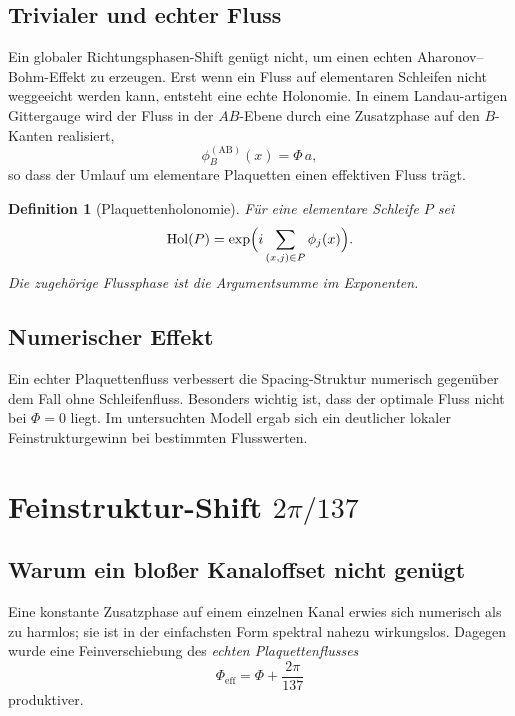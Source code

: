 \documentclass[11pt,a4paper]{article}
\newtheorem{definition}{Definition}[section]
\theoremstyle{remark}
\newcommand{\Hol}{\operatorname{Hol}}
\begin{document}
	\subsection{Trivialer und echter Fluss}
	
	Ein globaler Richtungsphasen-Shift genügt nicht, um einen echten Aharonov--Bohm-Effekt zu erzeugen. Erst wenn ein Fluss auf elementaren Schleifen nicht weggeeicht werden kann, entsteht eine echte Holonomie. In einem Landau-artigen Gittergauge wird der Fluss in der $AB$-Ebene durch eine Zusatzphase auf den $B$-Kanten realisiert,
	\begin{equation}
		\phi_B^{(\mathrm{AB})}(x)=\Phi\,a,
	\end{equation}
	so dass der Umlauf um elementare Plaquetten einen effektiven Fluss trägt.
	
	\begin{definition}[Plaquettenholonomie]
		Für eine elementare Schleife $P$ sei
		\begin{equation}
			\Hol(P)=\exp\Bigl(i\sum_{(x,j)\in P}\phi_j(x)\Bigr).
		\end{equation}
		Die zugehörige Flussphase ist die Argumentsumme im Exponenten.
	\end{definition}
	
	\subsection{Numerischer Effekt}
	
	Ein echter Plaquettenfluss verbessert die Spacing-Struktur numerisch gegenüber dem Fall ohne Schleifenfluss. Besonders wichtig ist, dass der optimale Fluss nicht bei $\Phi=0$ liegt. Im untersuchten Modell ergab sich ein deutlicher lokaler Feinstrukturgewinn bei bestimmten Flusswerten.
	
	\section{Feinstruktur-Shift $2\pi/137$}
	
	\subsection{Warum ein bloßer Kanaloffset nicht genügt}
	
	Eine konstante Zusatzphase auf einem einzelnen Kanal erwies sich numerisch als zu harmlos; sie ist in der einfachsten Form spektral nahezu wirkungslos. Dagegen wurde eine Feinverschiebung des \emph{echten Plaquettenflusses}
	\begin{equation}
		\Phi_{\mathrm{eff}} = \Phi + \frac{2\pi}{137}
	\end{equation}
	produktiver.
	
\end{document}
